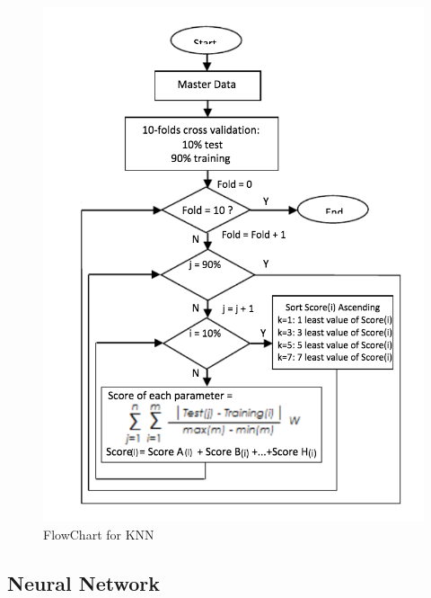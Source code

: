 \documentclass[oneside,12pt]{Classes/VTU}
\begin{document}
    		\begin{figure}
    			\begin{center}
    				\includegraphics[width=15cm]{images/knn.png}
    				\caption{FlowChart for KNN}
    			\end{center}
    		\end{figure}
    
  		\subsection{Neural Network}
\end{document}
